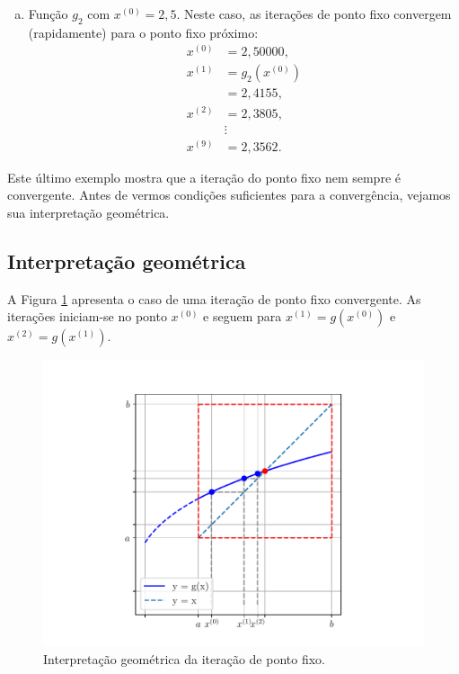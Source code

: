 \begin{ex}
\begin{enumerate}[a)]
  \item Função $g_2$ com $x^{(0)} = 2,5$.
    Neste caso, as iterações de ponto fixo convergem (rapidamente) para o ponto fixo próximo:
    \begin{align}
      x^{(0)} &= 2,50000,\\
      x^{(1)} &= g_2\left(x^{(0)}\right)\\
              &= 2,4155,\\
      x^{(2)} &= 2,3805,\\
              &\vdots \\
      x^{(9)} &= 2,3562.
    \end{align}    
  \end{enumerate}
\end{ex}

Este último exemplo mostra que a iteração do ponto fixo nem sempre é convergente. Antes de vermos condições suficientes para a convergência, vejamos sua interpretação geométrica.

\subsection{Interpretação geométrica}

A Figura \ref{cap_eq1d_sec_pfixo:fig:pfixo_interp} apresenta o caso de uma iteração de ponto fixo convergente. As iterações iniciam-se no ponto $x^{(0)}$ e seguem para $x^{(1)} = g(x^{(0)})$ e $x^{(2)} = g(x^{(1)})$.

\begin{figure}[H]
  \centering
  \includegraphics[width=\textwidth]{./cap_eq1d/dados/fig_pfixo_interp/fig}
  \caption{Interpretação geométrica da iteração de ponto fixo.}
  \label{cap_eq1d_sec_pfixo:fig:pfixo_interp}
\end{figure}


